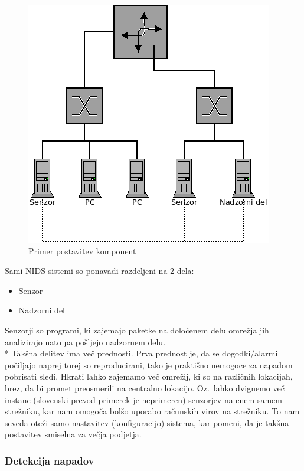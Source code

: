 \documentclass[12pt]{article}
\begin{document}
\begin{figure}[htb]
\begin{center}
\includegraphics[scale=0.5]{komponente.png}
\end{center}
\caption{Primer postavitev komponent}
\label{komponente}
\end{figure}

Sami NIDS sistemi so ponavadi razdeljeni na 2 dela:
\begin{itemize}
    \item Senzor
    \item Nadzorni del
\end{itemize}

Senzorji so programi, ki zajemajo paketke na določenem delu omrežja jih analizirajo nato pa pošljejo nadzornem delu.
\\*
Takšna delitev ima več prednosti. Prva prednost je, da se dogodki/alarmi počiljajo naprej torej so reproducirani, tako je praktišno nemogoce za napadom pobrisati sledi.
Hkrati lahko zajemamo več omrežij, ki so na različnih lokacijah, brez, da bi promet preosmerili na centralno lokacijo.
Oz.\ lahko dvignemo več instanc (slovenski prevod primerek je neprimeren) senzorjev na enem samem strežniku, kar nam omogoča bolšo uporabo računskih virov na strežniku.
To nam seveda oteži samo nastavitev (konfiguracijo) sistema, kar pomeni, da je takšna postavitev smiselna za večja podjetja.


\subsubsection{Detekcija napadov} %
\end{document}
